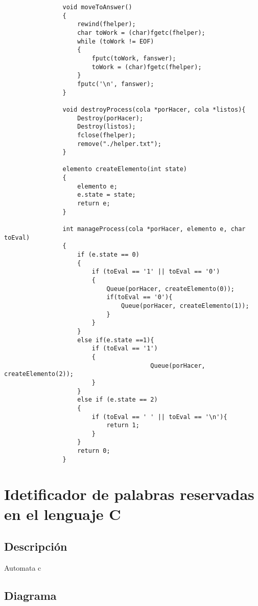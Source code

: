 \documentclass[11pt,a4paper]{report}
\begin{document}
\begin{lstlisting}
				void moveToAnswer()
				{
				    rewind(fhelper);
				    char toWork = (char)fgetc(fhelper);
				    while (toWork != EOF)
				    {
				        fputc(toWork, fanswer);
				        toWork = (char)fgetc(fhelper);
				    }
				    fputc('\n', fanswer);
				}
				
				void destroyProcess(cola *porHacer, cola *listos){
				    Destroy(porHacer);
				    Destroy(listos);
				    fclose(fhelper);
				    remove("./helper.txt");
				}
				
				elemento createElemento(int state)
				{
				    elemento e;
				    e.state = state;
				    return e;
				}
				
				int manageProcess(cola *porHacer, elemento e, char toEval)
				{
				    if (e.state == 0)
				    {
				        if (toEval == '1' || toEval == '0')
				        {
				            Queue(porHacer, createElemento(0));
				            if(toEval == '0'){
				                Queue(porHacer, createElemento(1));
				            }
				        }
				    }
				    else if(e.state ==1){
				        if (toEval == '1')
				        {
				                        Queue(porHacer, createElemento(2));
				        }
				    }
				    else if (e.state == 2)
				    {
				        if (toEval == ' ' || toEval == '\n'){
				            return 1;
				        }
				    }
				    return 0;
				}
	            \end{lstlisting}
	

	\chapter{Idetificador de palabras reservadas en el lenguaje C}
	 
		\section{Descripción}
		 
		Automata c

		\section{Diagrama}
	
	
\end{document}
